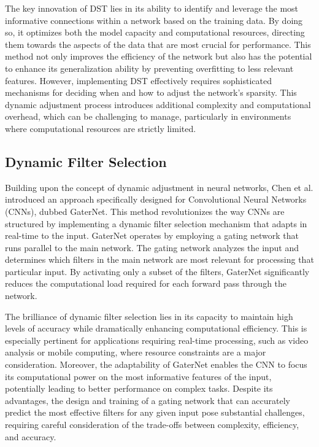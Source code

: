 The key innovation of DST lies in its ability to identify and leverage the most informative connections within a network based on the training data. By doing so, it optimizes both the model capacity and computational resources, directing them towards the aspects of the data that are most crucial for performance. This method not only improves the efficiency of the network but also has the potential to enhance its generalization ability by preventing overfitting to less relevant features. However, implementing DST effectively requires sophisticated mechanisms for deciding when and how to adjust the network's sparsity. This dynamic adjustment process introduces additional complexity and computational overhead, which can be challenging to manage, particularly in environments where computational resources are strictly limited.

\subsection{Dynamic Filter Selection}

Building upon the concept of dynamic adjustment in neural networks, Chen et al. \cite{chen2019you} introduced an approach specifically designed for Convolutional Neural Networks (CNNs), dubbed GaterNet. This method revolutionizes the way CNNs are structured by implementing a dynamic filter selection mechanism that adapts in real-time to the input. GaterNet operates by employing a gating network that runs parallel to the main network. The gating network analyzes the input and determines which filters in the main network are most relevant for processing that particular input. By activating only a subset of the filters, GaterNet significantly reduces the computational load required for each forward pass through the network.

The brilliance of dynamic filter selection lies in its capacity to maintain high levels of accuracy while dramatically enhancing computational efficiency. This is especially pertinent for applications requiring real-time processing, such as video analysis or mobile computing, where resource constraints are a major consideration. Moreover, the adaptability of GaterNet enables the CNN to focus its computational power on the most informative features of the input, potentially leading to better performance on complex tasks. Despite its advantages, the design and training of a gating network that can accurately predict the most effective filters for any given input pose substantial challenges, requiring careful consideration of the trade-offs between complexity, efficiency, and accuracy.

